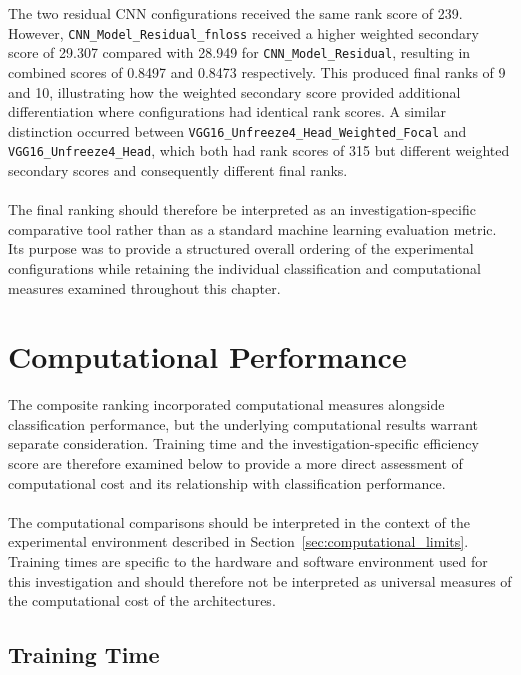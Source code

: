 \documentclass[12pt, a4paper]{report}
\let\oldsection\section
\renewcommand{\section}{%
    \Needspace{6\baselineskip}%
    \oldsection
}
\let\oldsubsection\subsection
\renewcommand{\subsection}{%
    \Needspace{6\baselineskip}%
    \oldsubsection
}
\begin{document}
			The two residual CNN configurations received the same rank score of 239. However, \texttt{CNN\_Model\_Residual\_fnloss} received a higher weighted secondary score of 29.307 compared with 28.949 for \texttt{CNN\_Model\_Residual}, resulting in combined scores of 0.8497 and 0.8473 respectively. This produced final ranks of 9 and 10, illustrating how the weighted secondary score provided additional differentiation where configurations had identical rank scores. A similar distinction occurred between \texttt{VGG16\_Unfreeze4\_Head\_Weighted\_Focal} and \texttt{VGG16\_Unfreeze4\_Head}, which both had rank scores of 315 but different weighted secondary scores and consequently different final ranks.\\\\
			The final ranking should therefore be interpreted as an investigation-specific comparative tool rather than as a standard machine learning evaluation metric. Its purpose was to provide a structured overall ordering of the experimental configurations while retaining the individual classification and computational measures examined throughout this chapter.
			
		\section{Computational Performance}
			
			The composite ranking incorporated computational measures alongside classification performance, but the underlying computational results warrant separate consideration. Training time and the investigation-specific efficiency score are therefore examined below to provide a more direct assessment of computational cost and its relationship with classification performance.\\\\
			The computational comparisons should be interpreted in the context of the experimental environment described in Section~\ref{sec:computational_limits}. Training times are specific to the hardware and software environment used for this investigation and should therefore not be interpreted as universal measures of the computational cost of the architectures.
			
			\subsection{Training Time}
				
\end{document}
